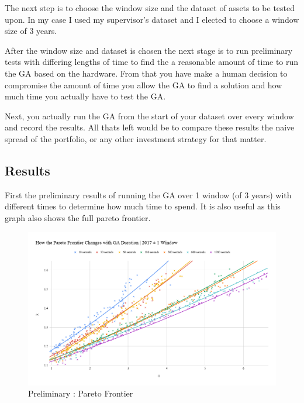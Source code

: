 \documentclass[11pt]{article}
\begin{document}
    The next step is to choose the window size and the dataset of assets to be tested upon.
    In my case I used my supervisor's dataset \cite{Dataset} and I elected to choose a window
    size of 3 years.

    After the window size and dataset is chosen the next stage is to run preliminary tests with
    differing lengths of time to find the a reasonable amount of time to run the GA based on
    the hardware. From that you have make a human decision to compromise the amount of time
    you allow the GA to find a solution and how much time you actually have to test the GA.

    Next, you actually run the GA from the start of your dataset over every window and record
    the results. All thats left would be to compare these results the naive spread of the
    portfolio, or any other investment strategy for that matter.

\subsection{Results}

    First the preliminary results of running the GA over 1 window (of 3 years) with different
    times to determine how much time to spend. It is also useful as this graph also shows
    the full pareto frontier.

    \begin{figure}[H] %
        \includegraphics[width=\textwidth]{HowTheParetoFrontierChangesWithGADuration_2017-1Window}
        \caption{Preliminary : Pareto Frontier}
            \label{fig:HowTheParetoFrontierChangesWithGADuration_2017-1Window}
    \end{figure}
\end{document}
